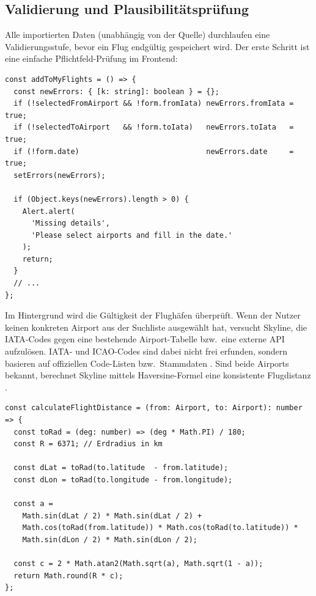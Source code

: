\subsection{Validierung und Plausibilitätsprüfung}
\label{subsec:import_validation}

Alle importierten Daten (unabhängig von der Quelle) durchlaufen eine Validierungsstufe, bevor ein Flug endgültig gespeichert wird.
Der erste Schritt ist eine einfache Pflichtfeld-Prüfung im Frontend:

\begin{lstlisting}[caption={Synchrones Pflichtfeld-Check im Import-Screen},label={lst:import_required_fields}]
const addToMyFlights = () => {
  const newErrors: { [k: string]: boolean } = {};
  if (!selectedFromAirport && !form.fromIata) newErrors.fromIata = true;
  if (!selectedToAirport   && !form.toIata)   newErrors.toIata   = true;
  if (!form.date)                             newErrors.date     = true;
  setErrors(newErrors);

  if (Object.keys(newErrors).length > 0) {
    Alert.alert(
      'Missing details',
      'Please select airports and fill in the date.'
    );
    return;
  }
  // ...
};
\end{lstlisting}

Im Hintergrund wird die Gültigkeit der Flughäfen überprüft.
Wenn der Nutzer keinen konkreten Airport aus der Suchliste ausgewählt hat, versucht Skyline, die IATA-Codes gegen eine bestehende Airport-Tabelle bzw.\ eine externe API aufzulösen.
IATA- und ICAO-Codes sind dabei nicht frei erfunden, sondern basieren auf offiziellen Code-Listen bzw.\ Stammdaten \cite{movableTypeLatLong,aviationstack}.
Sind beide Airports bekannt, berechnet Skyline mittels Haversine-Formel eine konsistente Flugdistanz \cite{movableTypeLatLong}.

\begin{lstlisting}[caption={Berechnung der Flugdistanz per Haversine-Formel (Import-Screen)},label={lst:haversine}]
const calculateFlightDistance = (from: Airport, to: Airport): number => {
  const toRad = (deg: number) => (deg * Math.PI) / 180;
  const R = 6371; // Erdradius in km

  const dLat = toRad(to.latitude  - from.latitude);
  const dLon = toRad(to.longitude - from.longitude);

  const a =
    Math.sin(dLat / 2) * Math.sin(dLat / 2) +
    Math.cos(toRad(from.latitude)) * Math.cos(toRad(to.latitude)) *
    Math.sin(dLon / 2) * Math.sin(dLon / 2);

  const c = 2 * Math.atan2(Math.sqrt(a), Math.sqrt(1 - a));
  return Math.round(R * c);
};
\end{lstlisting}

